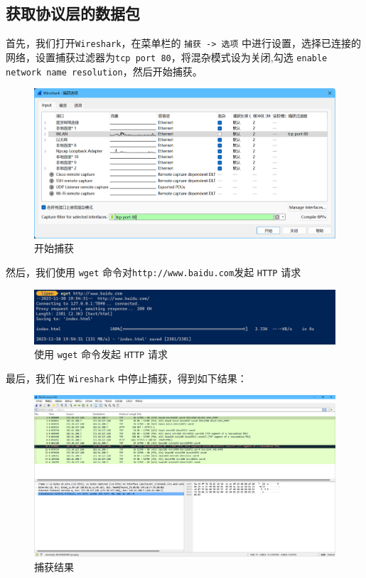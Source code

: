 \documentclass{article}
\begin{document}
\subsection{获取协议层的数据包}

首先，我们打开\texttt{Wireshark}，在菜单栏的 \texttt{捕获 -> 选项} 中进行设置，选择已连接的网络，设置捕获过滤器为\texttt{tcp port 80}，将混杂模式设为关闭,勾选 \texttt{enable network  name resolution}，然后开始捕获。

\begin{figure}[H]
  \centering
  \includegraphics[width=15cm]{images/01.png}
  \caption{开始捕获}
\end{figure}

然后，我们使用 \texttt{wget} 命令对\texttt{http://www.baidu.com}发起 \texttt{HTTP} 请求

\begin{figure}[H]
  \centering
  \includegraphics[width=15cm]{images/02.png}
  \caption{使用 \texttt{wget} 命令发起 \texttt{HTTP} 请求}
\end{figure}

最后，我们在 \texttt{Wireshark} 中停止捕获，得到如下结果：

\begin{figure}[H]
  \centering
  \includegraphics[width=15cm]{images/03.png}
  \caption{捕获结果}
\end{figure}
\end{document}
